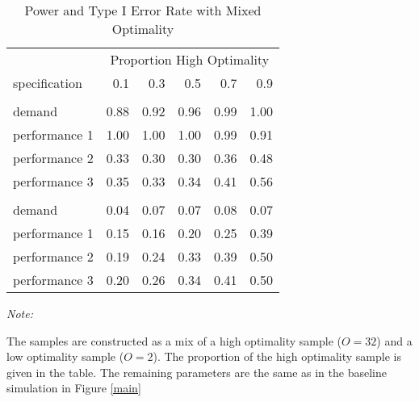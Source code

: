 \begin{table}

\caption{\label{tab:mix-optimality-table}Power and Type I Error Rate with Mixed Optimality}
\centering
\fontsize{9}{11}\selectfont
\begin{threeparttable}
\begin{tabular}[t]{lrrrrr}
\toprule
\multicolumn{1}{c}{ } & \multicolumn{5}{c}{Proportion High Optimality} \\
\cmidrule(l{3pt}r{3pt}){2-6}
specification & 0.1 & 0.3 & 0.5 & 0.7 & 0.9\\
\midrule
\addlinespace[0.3em]
\multicolumn{6}{c}{\textbf{Power}}\\
\hspace{1em}demand & 0.88 & 0.92 & 0.96 & 0.99 & 1.00\\
\hspace{1em}performance 1 & 1.00 & 1.00 & 1.00 & 0.99 & 0.91\\
\hspace{1em}performance 2 & 0.33 & 0.30 & 0.30 & 0.36 & 0.48\\
\hspace{1em}performance 3 & 0.35 & 0.33 & 0.34 & 0.41 & 0.56\\
\addlinespace[0.3em]
\multicolumn{6}{c}{\textbf{Type I}}\\
\hspace{1em}demand & 0.04 & 0.07 & 0.07 & 0.08 & 0.07\\
\hspace{1em}performance 1 & 0.15 & 0.16 & 0.20 & 0.25 & 0.39\\
\hspace{1em}performance 2 & 0.19 & 0.24 & 0.33 & 0.39 & 0.50\\
\hspace{1em}performance 3 & 0.20 & 0.26 & 0.34 & 0.41 & 0.50\\
\bottomrule
\end{tabular}
\begin{tablenotes}
\item \textit{Note: } 
\item The samples are constructed as a mix of a high optimality sample ($O=32$) and a low optimality sample ($O=2$). The proportion of the high optimality sample is given in the table. The remaining parameters are the same as in the baseline simulation in Figure \ref{main}
\end{tablenotes}
\end{threeparttable}
\end{table}